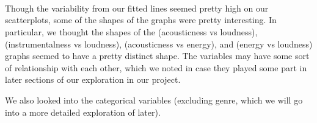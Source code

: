 \documentclass[11pt]{article}
\begin{document}
    \begin{center}
    \end{center}
    { \hspace*{\fill} \\}
    
    \begin{center}
    \end{center}
    { \hspace*{\fill} \\}
    
    \begin{center}
    \end{center}
    { \hspace*{\fill} \\}
    
    Though the variability from our fitted lines seemed pretty high on our
scatterplots, some of the shapes of the graphs were pretty interesting.
In particular, we thought the shapes of the (acousticness vs loudness),
(instrumentalness vs loudness), (acousticness vs energy), and (energy vs
loudness) graphs seemed to have a pretty distinct shape. The variables
may have some sort of relationship with each other, which we noted in
case they played some part in later sections of our exploration in our
project.

We also looked into the categorical variables (excluding genre, which we
will go into a more detailed exploration of later).
\end{document}
